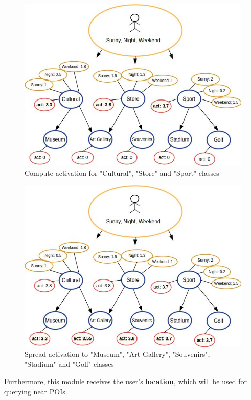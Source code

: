 \begin{figure}[h]
\centering
\includegraphics[scale=0.45]{draws/high_act.jpg}
\caption{Compute activation for "Cultural", "Store" and "Sport" classes}
\label{fig:high_act}
\end{figure}

\begin{figure}[h]
\centering
\includegraphics[scale=0.45]{draws/spread_act.jpg}
\caption{Spread activation to "Museum", "Art Gallery", "Souvenirs", "Stadium" and "Golf" classes}
\label{fig:spread_act}
\end{figure}

Furthermore, this module receives the user's \textbf{location}, which will be used for querying near POIs.

